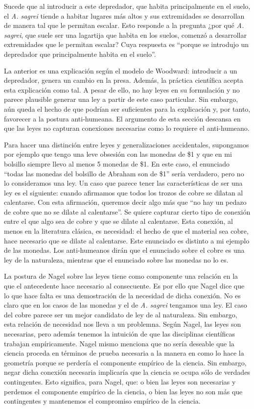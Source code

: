 Sucede que al introducir a este depredador, que habita principalmente en el suelo, el \textit{A. sagrei} tiende a habitar lugares más altos y sus extremidades se desarrollan de manera tal que le permitan escalar. Esto responde a la pregunta ¿por qué \textit{A. sagrei}, que suele ser una lagartija que habita en los suelos, comenzó a desarrollar extremidades que le permitan escalar? Cuya respuesta es ``porque se introdujo un depredador que principalmente habita en el suelo''.

La anterior es una explicación según el modelo de Woodward: introducir a un depredador, genera un cambio en la presa. Además, la práctica científica acepta esta explicación como tal. A pesar de ello, no hay leyes en su formulación y no parece plausible generar una ley a partir de este caso particular. Sin embargo, aún queda el hecho de que podrían ser suficientes para la explicación y, por tanto, favorecer a la postura anti-humeana. El argumento de esta sección descansa en que las leyes no capturan conexiones necesarias como lo requiere el anti-humeano.

Para hacer una distinción entre leyes y generalizaciones accidentales, supongamos por ejemplo que tengo una leve obsesión con las monedas de \$1 y que en mi bolsillo siempre llevo al menos 5 monedas de \$1. En este caso, el enunciado ``todas las monedas del bolsillo de Abraham son de \$1'' sería verdadero, pero no lo consideramos una ley. Un caso que parece tener las características de ser una ley es el siguiente: cuando afirmamos que todos los trozos de cobre se dilatan al calentarse.  Con esta afirmación, queremos decir algo más que ``no hay un pedazo de cobre que no se dilate al calentarse''. Se quiere capturar cierto tipo de conexión entre el que algo sea de cobre y que se dilate al calentarse. Esta conexión, al menos en la literatura clásica, es necesidad: el hecho de que el material sea cobre, hace necesario que se dilate al calentarse. Este enunciado es distinto a mi ejemplo de las monedas. Los anti-humeanos dirán que el enunciado sobre el cobre es una ley de la naturaleza, mientras que el enunciado sobre las monedas no lo es.

La postura de Nagel sobre las leyes tiene como componente una relación en la que el antecedente hace necesario al consecuente. Es por ello que Nagel dice que lo que hace falta es una demostración de la necesidad de dicha conexión. No es claro que en los casos de las monedas y el de \emph{A. sagrei} tengamos una ley. El caso del cobre parece ser un mejor candidato de ley de al naturaleza. Sin embargo, esta relación de necesidad nos lleva a un problemna. Según Nagel, las leyes son necesarias, pero además tenemos la intuición de que las disciplinas científicas trabajan empíricamente. Nagel mismo menciona que no sería deseable que la ciencia proceda en términos de prueba necesaria a la manera en como lo hace la geometría \cite[cfr., p. 53]{Nagel2006} porque se perdería el componente empírico de la ciencia. Sin embargo, negar dicha conexión necesaria implicaría que la ciencia se ocupa sólo de verdades contingentes. Esto significa, para Nagel, que: o bien las leyes son necesarias y perdemos el componente empírico de la ciencia, o bien las leyes no son más que contingentes y mantenemos el compromiso empírico de la ciencia.

